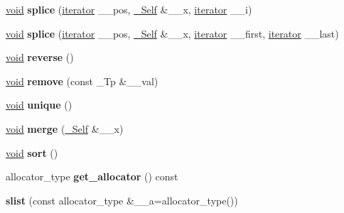 \begin{DoxyCompactItemize}
\item 
\mbox{\label{classslist_af007b198920ec69bcbb505f748b16cda}} 
\hyperlink{interfacevoid}{void} {\bfseries splice} (\hyperlink{structiterator}{iterator} \+\_\+\+\_\+pos, \hyperlink{classslist}{\+\_\+\+Self} \&\+\_\+\+\_\+x, \hyperlink{structiterator}{iterator} \+\_\+\+\_\+i)
\item 
\mbox{\label{classslist_a451ab5963bc85e39ab64defbfaca7a6c}} 
\hyperlink{interfacevoid}{void} {\bfseries splice} (\hyperlink{structiterator}{iterator} \+\_\+\+\_\+pos, \hyperlink{classslist}{\+\_\+\+Self} \&\+\_\+\+\_\+x, \hyperlink{structiterator}{iterator} \+\_\+\+\_\+first, \hyperlink{structiterator}{iterator} \+\_\+\+\_\+last)
\item 
\mbox{\label{classslist_ab02b39bf97f78d7a8d8161af94ac8013}} 
\hyperlink{interfacevoid}{void} {\bfseries reverse} ()
\item 
\mbox{\label{classslist_a189b77a98797effec33c280a3db32749}} 
\hyperlink{interfacevoid}{void} {\bfseries remove} (const \+\_\+\+Tp \&\+\_\+\+\_\+val)
\item 
\mbox{\label{classslist_a3e848b45c90302915a7b36e7a610c3eb}} 
\hyperlink{interfacevoid}{void} {\bfseries unique} ()
\item 
\mbox{\label{classslist_a0372d5605ed4619003a7517496568b24}} 
\hyperlink{interfacevoid}{void} {\bfseries merge} (\hyperlink{classslist}{\+\_\+\+Self} \&\+\_\+\+\_\+x)
\item 
\mbox{\label{classslist_abe0261d20621ec55d9d5e5cd535296e0}} 
\hyperlink{interfacevoid}{void} {\bfseries sort} ()
\item 
\mbox{\label{classslist_a9edecdb6fd71b4873a4b7fb2b247dd8f}} 
allocator\+\_\+type {\bfseries get\+\_\+allocator} () const
\item 
\mbox{\label{classslist_ace74b47cf2c4c5d6738b944e2dcdb1e1}} 
{\bfseries slist} (const allocator\+\_\+type \&\+\_\+\+\_\+a=allocator\+\_\+type())
\item 
\mbox{\label{classslist_acefbbaabb8cf368294000fc7594cc1ca}} 

\end{DoxyCompactItemize}
